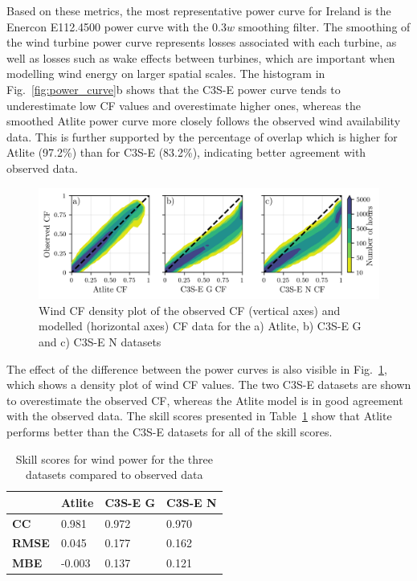 \documentclass[preprint, 12pt]{elsarticle}
\begin{document}
Based on these metrics, the most representative power curve for Ireland is the Enercon E112.4500 power curve with the $0.3w$ smoothing filter. The smoothing of the wind turbine power curve represents losses associated with each turbine, as well as losses such as wake effects between turbines, which are important when modelling wind energy on larger spatial scales. The histogram in Fig.~\ref{fig:power_curve}b shows that the C3S-E power curve tends to underestimate low CF values and overestimate higher ones, whereas the smoothed Atlite power curve more closely follows the observed wind availability data. This is further supported by the percentage of overlap which is higher for Atlite (97.2\%) than for C3S-E (83.2\%), indicating better agreement with observed data.

\begin{figure}[!ht]
	\centering
	\includegraphics[width=\textwidth]{verification_wind_contour.png}
	\caption{Wind CF density plot of the observed CF (vertical axes) and modelled (horizontal axes) CF data for the a) Atlite, b) C3S-E G and c) C3S-E N datasets}
	\label{fig:wind_verification_contour}
\end{figure}

The effect of the difference between the power curves is also visible in Fig.~\ref{fig:wind_verification_contour}, which shows a density plot of wind CF values. The two C3S-E datasets are shown to overestimate the observed CF, whereas the Atlite model is in good agreement with the observed data. The skill scores presented in Table~\ref{tab:wind_skill_scores} show that Atlite performs better than the C3S-E datasets for all of the skill scores. 

\begin{table}[!ht]
	\centering
	\begin{tabular}{l|lll|}
		\cline{2-4}
		& \textbf{Atlite} & \textbf{C3S-E G} & \textbf{C3S-E N} \\ \hline
		\multicolumn{1}{|l|}{\textbf{CC}}   & 0.981           & 0.972            & 0.970            \\ \hline
		\multicolumn{1}{|l|}{\textbf{RMSE}} & 0.045           & 0.177            & 0.162            \\ \hline
		\multicolumn{1}{|l|}{\textbf{MBE}}   & -0.003          & 0.137            & 0.121            \\ \hline
	\end{tabular}
	\caption{Skill scores for wind power for the three datasets compared to observed data}
	\label{tab:wind_skill_scores}
\end{table}
\end{document}
